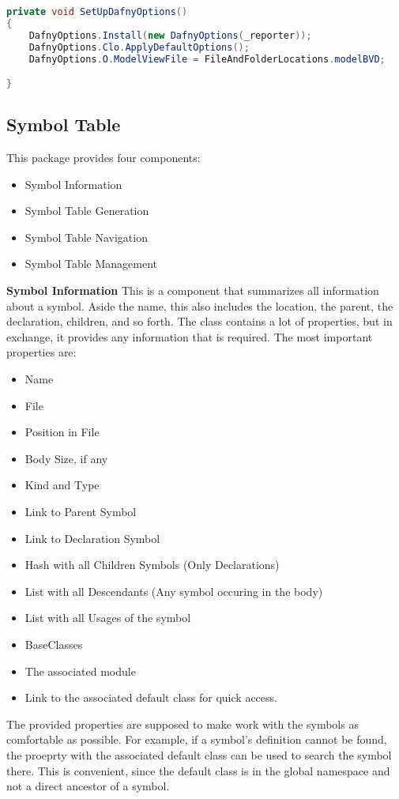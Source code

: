 


\begin{lstlisting}[language=csharp, caption={Setting up Dafny Options}, captionpos=b, label={lst:setupdafnyoptions}]
private void SetUpDafnyOptions()
{
    DafnyOptions.Install(new DafnyOptions(_reporter));
    DafnyOptions.Clo.ApplyDefaultOptions();
    DafnyOptions.O.ModelViewFile = FileAndFolderLocations.modelBVD;

}
\end{lstlisting}


\subsection{Symbol Table}
This package provides four components:
\begin{itemize}
    \item Symbol Information
    \item Symbol Table Generation
    \item Symbol Table Navigation
    \item Symbol Table Management
\end{itemize}

\textbf{Symbol Information}
This is a component that summarizes all information about a symbol. Aside the name, this also includes the location, the parent, the declaration, children, and so forth. The class contains a lot of properties, but in exchange, it provides any information that is required. The most important properties are:
\begin{itemize}
    \item Name
    \item File
    \item Position in File
    \item Body Size, if any
    \item Kind and Type
    \item Link to Parent Symbol
    \item Link to Declaration Symbol
    \item Hash with all Children Symbols (Only Declarations)
    \item List with all Descendants (Any symbol occuring in the body)
    \item List with all Usages of the symbol
    \item BaseClasses
    \item The associated module
    \item Link to the associated default class for quick access.
\end{itemize}
The provided properties are supposed to make work with the symbols as comfortable as possible. For example, if a symbol's definition cannot be found, the proeprty with the associated default class can be used to search the symbol there. This is convenient, since the default class is in the global namespace and not a direct ancestor of a symbol.

